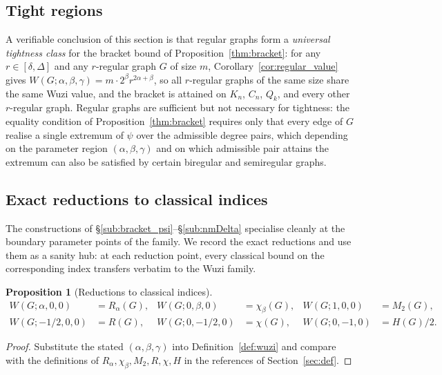 \documentclass[11pt,a4paper]{article}
\newtheorem{proposition}[theorem]{Proposition}
\theoremstyle{definition}
\newcommand{\Wuzi}{W(G;\alpha,\beta,\gamma)}
\begin{document}
\subsection{Tight regions}\label{sub:tight}

A verifiable conclusion of this section is that regular graphs
form a \emph{universal tightness class} for the bracket bound of
Proposition~\ref{thm:bracket}: for any $r \in [\delta, \Delta]$ and
any $r$-regular graph $G$ of size $m$, Corollary~\ref{cor:regular_value}
gives $\Wuzi = m \cdot 2^\beta r^{2\alpha + \beta}$, so all
$r$-regular graphs of the same size share the same Wuzi value, and
the bracket is attained on $K_n$, $C_n$, $Q_k$, and every other
$r$-regular graph. Regular graphs are sufficient but not necessary
for tightness: the equality condition of Proposition~\ref{thm:bracket}
requires only that every edge of $G$ realise a single extremum of
$\psi$ over the admissible degree pairs, which depending on the
parameter region $(\alpha, \beta, \gamma)$ and on which admissible
pair attains the extremum can also be satisfied by certain
biregular and semiregular graphs.

\subsection{Exact reductions to classical indices}\label{sub:reductions}

The constructions of \S\ref{sub:bracket_psi}--\S\ref{sub:nmDelta}
specialise cleanly at the boundary parameter points of the family.
We record the exact reductions and use them as a sanity hub: at
each reduction point, every classical bound on the corresponding
index transfers verbatim to the Wuzi family.

\begin{proposition}[Reductions to classical indices]\label{prop:reductions}
\begin{align*}
W(G;\alpha,0,0)&=R_\alpha(G), &
W(G;0,\beta,0)&=\chi_\beta(G), &
W(G;1,0,0)&=M_2(G), \\
W(G;-1/2,0,0)&=R(G), &
W(G;0,-1/2,0)&=\chi(G), &
W(G;0,-1,0)&=H(G)/2.
\end{align*}
\end{proposition}

\begin{proof}
Substitute the stated $(\alpha,\beta,\gamma)$ into
Definition~\ref{def:wuzi} and compare with the definitions of
$R_\alpha, \chi_\beta, M_2, R, \chi, H$ in the references of
Section~\ref{sec:def}.
\end{proof}
\end{document}
